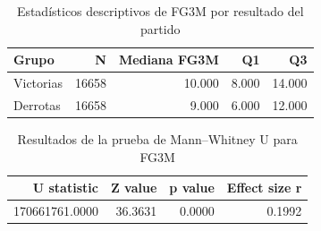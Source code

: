 \begin{table}[H]
\centering
\caption{Estadísticos descriptivos de FG3M por resultado del partido}
\label{tab:fg3m_descriptivos}
\begin{tabular}{lrrrr}
\toprule
Grupo & N & Mediana FG3M & Q1 & Q3 \\
\midrule
Victorias & 16658 & 10.000 & 8.000 & 14.000 \\
Derrotas & 16658 & 9.000 & 6.000 & 12.000 \\
\bottomrule
\end{tabular}
\end{table}

\begin{table}[H]
\centering
\caption{Resultados de la prueba de Mann--Whitney U para FG3M}
\label{tab:mann_whitney_fg3m}
\begin{tabular}{rrrr}
\toprule
U statistic & Z value & p value & Effect size r \\
\midrule
170661761.0000 & 36.3631 & 0.0000 & 0.1992 \\
\bottomrule
\end{tabular}
\end{table}
